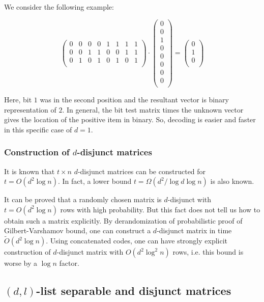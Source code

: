 \documentclass{article}
\begin{document}
We consider the following example:

$$\begin{pmatrix}
  0 & 0 & 0 & 0 & 1 & 1 & 1 & 1 \\
  0 & 0 & 1 & 1 & 0 & 0 & 1 & 1 \\
  0 & 1 & 0 & 1 & 0 & 1 & 0 & 1 \\
\end{pmatrix}
\cdot
\begin{pmatrix}
  0 \\
  0 \\
  1 \\
  0 \\
  0 \\
  0 \\
  0 \\
  0 \\
\end{pmatrix}
=
\begin{pmatrix}
  0 \\
  1 \\
  0 \\
\end{pmatrix}$$

Here, bit $1$ was in the second position and the resultant vector is binary
representation of $2$. In general, the bit test matrix times the unknown vector
gives the location of the positive item in binary. So, decoding is easier and
faster in this specific case of $d = 1$.

\subsubsection{Construction of $d$-disjunct matrices}
It is known that $t \times n$ $d$-disjunct matrices can be constructed for
$t = O(d^2\log{n})$. In fact, a lower bound $t = \Omega(d^2/\log{d}\log{n})$
is also known.

It can be proved that a randomly chosen matrix is $d$-disjunct with $t = O(d^2\log{n})$
rows with high probability. But this fact does not tell us how to obtain such a matrix
explicitly. By derandomization of probabilistic proof of Gilbert-Varshamov bound\cite{rudra709lec6},
one can construct a $d$-disjunct matrix in time $\tilde{O}(d^2\log{n})$. Using concatenated
codes, one can have strongly explicit construction of $d$-disjunct matrix with
$O(d^2\log^2{n})$ rows, i.e. this bound is worse by a $\log{n}$ factor.

\subsection{$(d,l)$-list separable and disjunct matrices}
\end{document}
